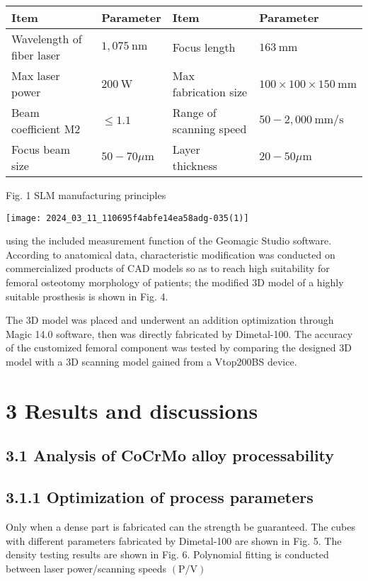 \documentclass[10pt]{article}
\begin{document}
\begin{center}
\begin{tabular}{llll}
\hline
Item & Parameter & Item & Parameter \\
\hline
Wavelength of fiber laser & $1,075 \mathrm{~nm}$ & Focus length & $163 \mathrm{~mm}$ \\
Max laser power & $200 \mathrm{~W}$ & Max fabrication size & $100 \times 100 \times 150 \mathrm{~mm}$ \\
Beam coefficient M2 & $\leq 1.1$ & Range of scanning speed & $50-2,000 \mathrm{~mm} / \mathrm{s}$ \\
Focus beam size & $50-70 \mu \mathrm{m}$ & Layer thickness & $20-50 \mu \mathrm{m}$ \\
\hline
\end{tabular}
\end{center}

Fig. 1 SLM manufacturing principles

\begin{center}
\texttt{[image: 2024\_03\_11\_110695f4abfe14ea58adg-035(1)]}
\end{center}

using the included measurement function of the Geomagic Studio software. According to anatomical data, characteristic modification was conducted on commercialized products of CAD models so as to reach high suitability for femoral osteotomy morphology of patients; the modified 3D model of a highly suitable prosthesis is shown in Fig. 4.

The 3D model was placed and underwent an addition optimization through Magic 14.0 software, then was directly fabricated by Dimetal-100. The accuracy of the customized femoral component was tested by comparing the designed 3D model with a 3D scanning model gained from a Vtop200BS device.

\section*{3 Results and discussions}
\subsection*{3.1 Analysis of CoCrMo alloy processability}
\subsection*{3.1.1 Optimization of process parameters}
Only when a dense part is fabricated can the strength be guaranteed. The cubes with different parameters fabricated by Dimetal-100 are shown in Fig. 5. The density testing results are shown in Fig. 6. Polynomial fitting is conducted between laser power/scanning speeds $(\mathrm{P} / \mathrm{V})$
\end{document}
